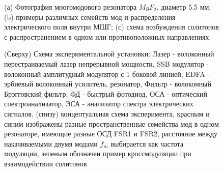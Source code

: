 
\begin{figure}[!htb]
\begin{minipage}{1\linewidth}
\end{minipage}
\caption{(а) Фотография многомодового резонатора $MgF_2$, диаметр 5.5 мм; (b) примеры различных семейств мод и распределения электрического поля внутри МШГ; (с) схема возбуждения солитонов с распространением в одном или противоположных направлениях.}
\label{Figure1_V1_c}
\end{figure}

\begin{figure}[!htb]
\begin{minipage}{1\linewidth}
\end{minipage}
\caption{(Сверху) Схема экспериментальной установки: Лазер - волоконный перестраиваемый лазер непрерывной мощности, SSB модулятор - волоконный амплитудный модулятор с 1 боковой линией, EDFA - эрбиевый волоконный усилитель, резонатор, Фильтр - волоконный Брэгговский фильтр, ФД - быстрый фотодиод, ОСА - оптический спектроанализатор, ЭСА - анализатор спектра электрических сигналов. (снизу) концептуальная схема эксперимента, красным и синим изображены разные пространственные семейства мод в одном резонаторе, имеющие разные ОСД FSR1 и FSR2, расстояние между накачиваемыми двумя модами $f_m$ выбирается как частота модуляции, зеленым обозначен пример кроссмодуляции при взаимодействии солитонов}
\label{Figure1_V1_c}
\end{figure}



